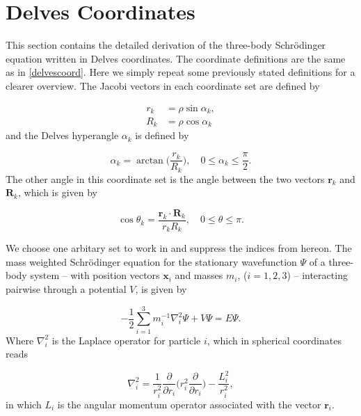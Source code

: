 \section{Delves Coordinates}\label{delves}
This section contains the detailed derivation of the three-body Schr{\"o}dinger equation written in Delves coordinates. The coordinate definitions are the same as in \cref{delvescoord}. Here we simply repeat some previously stated definitions for a clearer overview. The Jacobi vectors in each coordinate set are defined by

\begin{subequations}
	\begin{align}
	r_{k} &= \rho \sin{\alpha_{k}},\\
	R_{k} &= \rho \cos{\alpha_{k}}
	\end{align}
\end{subequations}
and the Delves hyperangle $\alpha_{k}$ is defined by

\begin{equation}
\alpha_{k} = \arctan\bigg(\frac{r_{k}}{R_{k}}\bigg), \quad 0\leq \alpha_{k} \leq \frac{\pi}{2}.
\end{equation}
The other angle in this coordinate set is the angle between the two vectors $\mathbf{r}_{k}$ and $\mathbf{R}_{k}$, which is given by

\begin{equation}
\cos{\theta_{k}} = \frac{\mathbf{r}_{k} \cdot \mathbf{R}_{k}}{r_{k} R_{k}}, \quad  0\leq \theta \leq \pi.
\end{equation}

We choose one arbitary set to work in and suppress the indices from hereon. The mass weighted Schr{\"o}dinger equation for the stationary wavefunction $\Psi$ of a three-body system -- with position vectors $\mathbf{x}_i$ and masses $m_i$, ($i=1,2,3$) -- interacting pairwise through a potential $V$, is given by

\begin{equation}
-\frac{1}{2} \sum_{i=1}^{3} m^{-1}_{i} \nabla^{2}_i \Psi + V\Psi = E \Psi. 
\end{equation}
Where $\nabla_i^{2}$ is the Laplace operator for particle $i$, which in spherical coordinates reads

\begin{equation}
\nabla_i^2 = \frac{1}{r_i^{2}}\frac{\partial}{\partial r_i} \bigg(r_i^{2} \frac{\partial}{\partial r_i}\bigg) - \frac{L_i^{2}}{r_i^{2}},
\end{equation}
in which $L_i$ is the angular momentum operator associated with the vector $\mathbf{r}_i$. 


